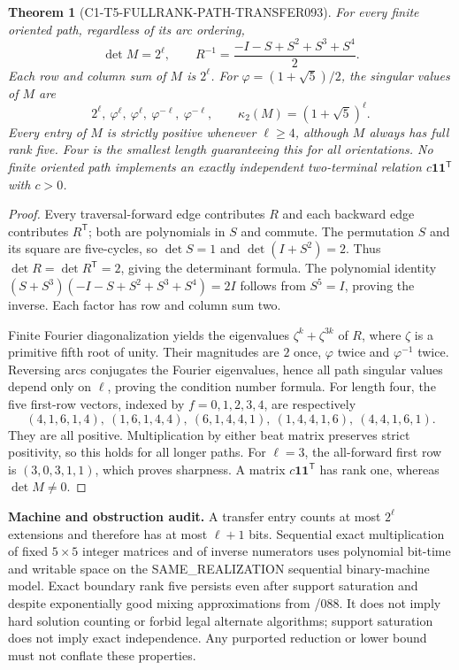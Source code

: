\documentclass[11pt]{article}
\newtheorem{theorem}{Theorem}
\begin{document}
\begin{theorem}[C1-T5-FULLRANK-PATH-TRANSFER093]
For every finite oriented path, regardless of its arc ordering,
\[
 \boxed{\det M=2^\ell,\qquad
       R^{-1}=\frac{-I-S+S^2+S^3+S^4}{2}.}
\]
Each row and column sum of $M$ is $2^\ell$.
For $\varphi=(1+\sqrt5)/2$, the singular values of $M$ are
\[
 2^\ell,\ \varphi^\ell,\ \varphi^\ell,\
 \varphi^{-\ell},\ \varphi^{-\ell},
 \qquad
 \kappa_2(M)=(1+\sqrt5)^\ell.
\]
Every entry of $M$ is strictly positive whenever $\ell\ge4$,
although $M$ always has full rank five.
Four is the smallest length guaranteeing this for all orientations.
No finite oriented path implements an exactly independent two-terminal
relation $c\mathbf1\mathbf1^{\mathsf T}$ with $c>0$.
\end{theorem}
\begin{proof}
Every traversal-forward edge contributes $R$ and each backward edge
contributes $R^{\mathsf T}$; both are polynomials in $S$ and commute.
The permutation $S$ and its square are five-cycles, so
$\det S=1$ and $\det(I+S^2)=2$.
Thus $\det R=\det R^{\mathsf T}=2$, giving the determinant formula.
The polynomial identity
$(S+S^3)(-I-S+S^2+S^3+S^4)=2I$ follows from $S^5=I$,
proving the inverse. Each factor has row and column sum two.

Finite Fourier diagonalization yields the eigenvalues
$\zeta^k+\zeta^{3k}$ of $R$, where $\zeta$ is a primitive
fifth root of unity. Their magnitudes are $2$ once,
$\varphi$ twice and $\varphi^{-1}$ twice. Reversing arcs conjugates
the Fourier eigenvalues, hence all path singular values depend
only on $\ell$, proving the condition number formula.
For length four, the five first-row vectors, indexed by
$f=0,1,2,3,4$, are respectively
\[
(4,1,6,1,4),\ (1,6,1,4,4),\ (6,1,4,4,1),\
(1,4,4,1,6),\ (4,4,1,6,1).
\]
They are all positive. Multiplication by either beat matrix
preserves strict positivity, so this holds for all longer paths.
For $\ell=3$, the all-forward first row is $(3,0,3,1,1)$,
which proves sharpness. A matrix $c\mathbf1\mathbf1^{\mathsf T}$
has rank one, whereas $\det M\ne0$.
\end{proof}

\noindent\textbf{Machine and obstruction audit.}
A transfer entry counts at most $2^\ell$ extensions and therefore
has at most $\ell+1$ bits. Sequential exact multiplication of
fixed $5\times5$ integer matrices and of inverse numerators
uses polynomial bit-time and writable space on the SAME\_REALIZATION
sequential binary-machine model. Exact boundary rank five persists
even after support saturation and despite exponentially good
mixing approximations from /088. It does not imply hard solution
counting or forbid legal alternate algorithms; support saturation
does not imply exact independence. Any purported reduction or
lower bound must not conflate these properties.
\end{document}
